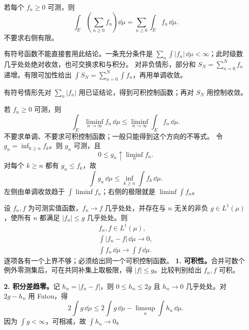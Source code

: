 若每个 $f_n\ge0$ 可测，则
\[
\int_E\left(\sum_{n\ge0}f_n\right)\dd\mu
=\sum_{n\ge0}\int_E f_n\,\dd\mu.
\]
不要求右侧有限。

有符号函数不能直接套用此结论。一条充分条件是 $\sum_n\int|f_n|\,\dd\mu<\infty$；此时级数几乎处处绝对收敛，也可交换求和与积分。
对非负情形，部分和 $S_N=\sum_{n=0}^Nf_n$ 递增。有限可加性给出 $\int S_N=\sum_{n=0}^N\int f_n$，再用单调收敛。

有符号情形先对 $\sum_n|f_n|$ 用已证结论，得到可积控制函数；再对 $S_N$ 用控制收敛。

若 $f_n\ge0$ 可测，则
\[
\int_E\liminf_{n\to\infty}f_n\,\dd\mu
\le\liminf_{n\to\infty}\int_E f_n\,\dd\mu.
\]
不要求单调、不要求可积控制函数；一般只能得到这个方向的不等式。
令 $g_n=\inf_{k\ge n}f_k$。则 $g_n$ 可测，且
\[
0\le g_n\uparrow\liminf_n f_n.
\]
对每个 $k\ge n$ 都有 $g_n\le f_k$，故
\[
\int g_n\,\dd\mu\le\inf_{k\ge n}\int f_k\,\dd\mu.
\]
左侧由单调收敛趋于 $\int\liminf f_n$；右侧的极限就是 $\liminf\int f_n$。

设 $f_n,f$ 为可测实值函数，$f_n\to f$ 几乎处处，并存在与 $n$ 无关的非负 $g\in L^1(\mu)$，使所有 $n$ 都满足 $|f_n|\le g$ 几乎处处。则
\[
\begin{gathered}
f_n,f\in L^1(\mu),\\
\int|f_n-f|\,\dd\mu\longrightarrow0,\\
\int f_n\,\dd\mu\longrightarrow\int f\,\dd\mu.
\end{gathered}
\]
逐项各有一个上界不够；必须给出同一个可积控制函数。
\textbf{1. 可积性。}合并可数个例外零测集后，可在共同补集上取极限，得 $|f|\le g$。比较判别给出 $f_n,f$ 可积。

\textbf{2. 积分差趋零。}记 $h_n=|f_n-f|$，则 $0\le h_n\le2g$ 且 $h_n\to0$ 几乎处处。对 $2g-h_n$ 用 Fatou，得
\[
2\int g\,\dd\mu
\le2\int g\,\dd\mu-\limsup_n\int h_n\,\dd\mu.
\]
因为 $\int g<\infty$，可相减，故 $\int h_n\to0$。

